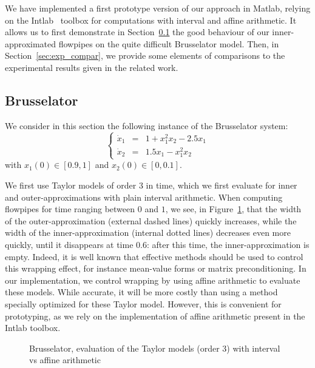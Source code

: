 We have implemented a first prototype version of our approach in Matlab, relying on the Intlab~\cite{Ru99a} 
toolbox for computations with interval and affine arithmetic.
It allows us to first demonstrate in Section~\ref{sec:exp_bruss} the good behaviour of our inner-approximated flowpipes
 on the quite difficult Brusselator model. %
Then, in Section~\ref{sec:exp_compar}, we provide some elements of comparisons to the experimental results 
given in the related work. 
 
\subsection{Brusselator}
\label{sec:exp_bruss}

We consider in this section the following instance of the Brusselator system: 
$$\left\{\begin{array}{rcl}
\dot{x}_1 & = & 1+x_1^2x_2-2.5x_1 \\
\dot{x}_2 & = & 1.5x_1-x_1^2x_2
\end{array}\right.$$
\noindent with $x_1(0) \in [0.9,1]$ and $x_2(0) \in [0,0.1]$.

We first use Taylor models of order 3 in time, which we first evaluate for inner and outer-approximations 
with plain interval arithmetic. When computing flowpipes for time ranging between $0$ and $1$, 
we see, in Figure~\ref{fig:brusselator_order3_t1}, that the width of the outer-approximation 
(external dashed lines) quickly increases, while the 
width of the inner-approximation (internal dotted lines) decreases even more quickly, 
until it disappears at time 0.6: after this time, the inner-approximation is empty. Indeed, it is well 
known that effective methods should be used to control this wrapping effect, for instance mean-value 
forms or matrix preconditioning. In our implementation, we control wrapping by using 
affine arithmetic to evaluate these models. While accurate, it will be more costly than using 
a method specially optimized for these Taylor model. However, this is convenient for prototyping, 
as we rely on the implementation of affine arithmetic present in the Intlab 
toolbox.
 
\begin{figure}[htbp]
\begin{center}
\end{center}
\caption{Brusselator, evaluation of the Taylor models (order 3) with interval vs affine arithmetic \label{fig:brusselator_order3_t1}}
\end{figure}

